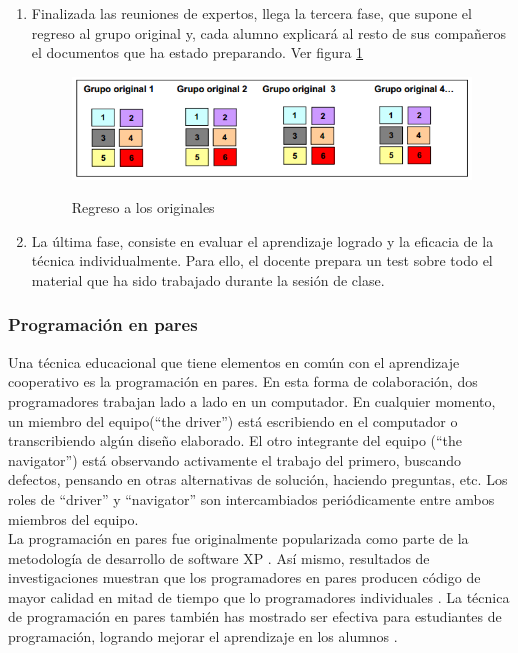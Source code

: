 \begin{enumerate}
    \item Finalizada las reuniones de expertos, llega la tercera fase, que supone el regreso al grupo original y, cada alumno explicará al resto de sus compañeros el documentos que ha estado preparando. Ver figura \ref{fig:jigsaw03}

\begin{figure}[h]
  \centering
  \includegraphics[scale=0.6]{figuras/jigsaw03.png}\\
  \caption{Regreso a los originales}\label{fig:jigsaw03}
\end{figure}

\item La última fase, consiste en evaluar el aprendizaje logrado y la eficacia de la técnica individualmente. Para ello, el docente prepara un test sobre todo el material que ha sido trabajado durante la sesión de clase.

\end{enumerate}

\subsubsection{Programación en pares}
Una técnica educacional que tiene elementos en común con el aprendizaje cooperativo es la programación en pares. En esta forma de colaboración, dos programadores trabajan lado a lado en un computador. En cualquier momento, un miembro del equipo(``the driver'') está escribiendo en el computador o transcribiendo algún diseño elaborado. El otro integrante del equipo (``the navigator'') está observando activamente el trabajo del primero, buscando defectos, pensando en otras alternativas de solución, haciendo preguntas, etc. Los roles de ``driver'' y ``navigator'' son intercambiados periódicamente entre ambos miembros del equipo.\\

La programación en pares fue originalmente popularizada como parte de la metodología de desarrollo de software XP \cite{beck_extreme_2000}. Así mismo, resultados de investigaciones muestran que los programadores en pares producen código de mayor calidad en mitad de tiempo que lo programadores individuales \cite{williams2000collaborative,williams_strengthening_2000}. La técnica de programación en pares también has mostrado ser efectiva para estudiantes de programación, logrando mejorar el aprendizaje en los alumnos \cite{mcdowell_effects_2002}.

